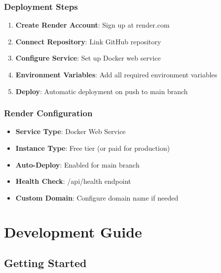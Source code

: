 \documentclass[12pt,a4paper]{article}
\begin{document}
\subsubsection{Deployment Steps}
\begin{enumerate}
    \item \textbf{Create Render Account}: Sign up at render.com
    \item \textbf{Connect Repository}: Link GitHub repository
    \item \textbf{Configure Service}: Set up Docker web service
    \item \textbf{Environment Variables}: Add all required environment variables
    \item \textbf{Deploy}: Automatic deployment on push to main branch
\end{enumerate}

\subsubsection{Render Configuration}
\begin{itemize}
    \item \textbf{Service Type}: Docker Web Service
    \item \textbf{Instance Type}: Free tier (or paid for production)
    \item \textbf{Auto-Deploy}: Enabled for main branch
    \item \textbf{Health Check}: /api/health endpoint
    \item \textbf{Custom Domain}: Configure domain name if needed
\end{itemize}

\section{Development Guide}

\subsection{Getting Started}
\end{document}
